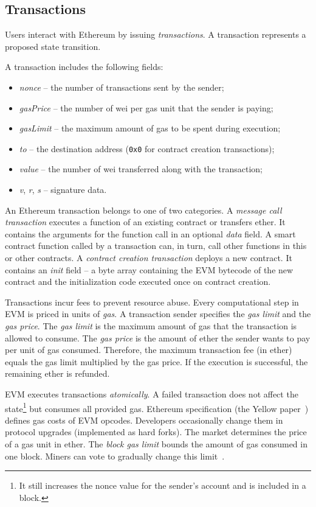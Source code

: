 \subsection{Transactions}

Users interact with Ethereum by issuing \textit{transactions}.
A transaction represents a proposed state transition.

A transaction includes the following fields:
\begin{itemize}
	\item \emph{nonce} -- the number of transactions sent by the sender;
	\item \emph{gasPrice} -- the number of wei per gas unit that the sender is paying;
	\item \emph{gasLimit} -- the maximum amount of gas to be spent during execution;
	\item \emph{to} -- the destination address (\texttt{0x0} for contract creation transactions);
	\item \emph{value} -- the number of wei transferred along with the transaction;
	\item \emph{v}, \emph{r}, \emph{s} -- signature data.
\end{itemize}

An Ethereum transaction belongs to one of two categories.
A \textit{message call transaction} executes a function of an existing contract or transfers ether.
It contains the arguments for the function call in an optional \textit{data} field.
A smart contract function called by a transaction can, in turn, call other functions in this or other contracts.
A \textit{contract creation transaction} deploys a new contract.
It contains an \emph{init} field -- a byte array containing the EVM bytecode of the new contract and the initialization code executed once on contract creation.

Transactions incur fees to prevent resource abuse.
Every computational step in EVM is priced in units of \emph{gas}.
A transaction sender specifies the \textit{gas limit} and the \textit{gas price}.
The \textit{gas limit} is the maximum amount of gas that the transaction is allowed to consume.
The \textit{gas price} is the amount of ether the sender wants to pay per unit of gas consumed.
Therefore, the maximum transaction fee (in ether) equals the gas limit multiplied by the gas price.
If the execution is successful, the remaining ether is refunded.

EVM executes transactions \textit{atomically}.
A failed transaction does not affect the state\footnote{It still increases the nonce value for the sender's account and is included in a block.} but consumes all provided gas.
Ethereum specification (the Yellow paper~\cite{Wood2014}) defines gas costs of EVM opcodes.
Developers occasionally change them in protocol upgrades (implemented as hard forks).
The market determines the price of a gas unit in ether.
The \textit{block gas limit} bounds the amount of gas consumed in one block.
Miners can vote to gradually change this limit~\cite{Jnnk15}.



